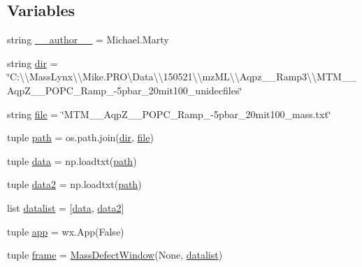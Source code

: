 \subsection*{Variables}
\begin{DoxyCompactItemize}
\item 
string \hyperlink{namespace_uni_dec_1_1unidec__modules_1_1_mass_defects_af197252596cd1d80d3d2450889ce9a62}{\+\_\+\+\_\+author\+\_\+\+\_\+} = \textquotesingle{}Michael.\+Marty\textquotesingle{}
\item 
string \hyperlink{namespace_uni_dec_1_1unidec__modules_1_1_mass_defects_a451b712e413ab73c46513a51c4286192}{dir} = \char`\"{}C\+:\textbackslash{}\textbackslash{}\+Mass\+Lynx\textbackslash{}\textbackslash{}\+Mike.\+P\+R\+O\textbackslash{}\+Data\textbackslash{}\textbackslash{}150521\textbackslash{}\textbackslash{}mz\+M\+L\textbackslash{}\textbackslash{}\+Aqpz\+\_\+\_\+\+Ramp3\textbackslash{}\textbackslash{}\+M\+T\+M\+\_\+\_\+\+Aqp\+Z\+\_\+\_\+\+P\+O\+P\+C\+\_\+\+Ramp\+\_-\/5pbar\+\_\+20mit100\+\_\+unidecfiles\char`\"{}
\item 
string \hyperlink{namespace_uni_dec_1_1unidec__modules_1_1_mass_defects_a425742773f2151e1357cd0de46d2727f}{file} = \char`\"{}M\+T\+M\+\_\+\_\+\+Aqp\+Z\+\_\+\_\+\+P\+O\+P\+C\+\_\+\+Ramp\+\_-\/5pbar\+\_\+20mit100\+\_\+mass.\+txt\char`\"{}
\item 
tuple \hyperlink{namespace_uni_dec_1_1unidec__modules_1_1_mass_defects_aff5fe5c86f53ebe5a7a30e769d771df6}{path} = os.\+path.\+join(\hyperlink{namespace_uni_dec_1_1unidec__modules_1_1_mass_defects_a451b712e413ab73c46513a51c4286192}{dir}, \hyperlink{namespace_uni_dec_1_1unidec__modules_1_1_mass_defects_a425742773f2151e1357cd0de46d2727f}{file})
\item 
tuple \hyperlink{namespace_uni_dec_1_1unidec__modules_1_1_mass_defects_a6658a7410c1391f2023680b9157d3ad4}{data} = np.\+loadtxt(\hyperlink{namespace_uni_dec_1_1unidec__modules_1_1_mass_defects_aff5fe5c86f53ebe5a7a30e769d771df6}{path})
\item 
tuple \hyperlink{namespace_uni_dec_1_1unidec__modules_1_1_mass_defects_acb92eaa7d0baab1f8eb26bca0f122616}{data2} = np.\+loadtxt(\hyperlink{namespace_uni_dec_1_1unidec__modules_1_1_mass_defects_aff5fe5c86f53ebe5a7a30e769d771df6}{path})
\item 
list \hyperlink{namespace_uni_dec_1_1unidec__modules_1_1_mass_defects_abb79625f9bbc1bde880bacfc9f1c25c2}{datalist} = \mbox{[}\hyperlink{namespace_uni_dec_1_1unidec__modules_1_1_mass_defects_a6658a7410c1391f2023680b9157d3ad4}{data}, \hyperlink{namespace_uni_dec_1_1unidec__modules_1_1_mass_defects_acb92eaa7d0baab1f8eb26bca0f122616}{data2}\mbox{]}
\item 
tuple \hyperlink{namespace_uni_dec_1_1unidec__modules_1_1_mass_defects_a84f6b36f7788263cf46e9d3ae77aea4c}{app} = wx.\+App(False)
\item 
tuple \hyperlink{namespace_uni_dec_1_1unidec__modules_1_1_mass_defects_a4501d304a3583a083e16a2fb6b896780}{frame} = \hyperlink{class_uni_dec_1_1unidec__modules_1_1_mass_defects_1_1_mass_defect_window}{Mass\+Defect\+Window}(None, \hyperlink{namespace_uni_dec_1_1unidec__modules_1_1_mass_defects_abb79625f9bbc1bde880bacfc9f1c25c2}{datalist})
\end{DoxyCompactItemize}


